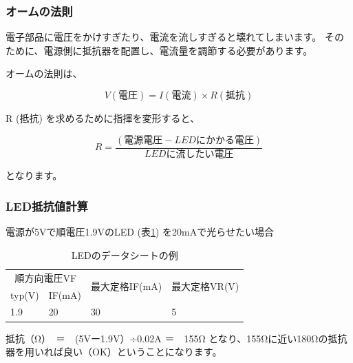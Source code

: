 \documentclass[11pt,a4paper]{jarticle}
\begin{document}
\subsubsection*{オームの法則}
電子部品に電圧をかけすぎたり、電流を流しすぎると壊れてしまいます。
そのために、電源側に抵抗器を配置し、電流量を調節する必要があります。

オームの法則は、

\begin{equation}
 V (電圧) = I (電流) \times R (抵抗)
\end{equation}

R (抵抗) を求めるために指揮を変形すると、

\begin{equation}
 R = \frac{(電源電圧 - LEDにかかる電圧)}{LEDに流したい電圧}
\end{equation}

となります。

\subsubsection*{LED抵抗値計算}
電源が5Vで順電圧1.9VのLED (表\ref{tb:dataSheet}) を20mAで光らせたい場合

\begin{table}[htb]
 \begin{center}
 \caption{LEDのデータシートの例}
 \label{tb:dataSheet}
  \begin{tabular}{|l|l|l|l|} \hline
   \multicolumn{2}{|c|}{順方向電圧VF} & \multirow{2}{*}{最大定格IF(mA)} & \multirow{2}{*}{最大定格VR(V)} \\ \cline{1-2}
   typ(V) & IF(mA) & &\\ \hline
   1.9 & 20 & 30 & 5 \\ \hline
  \end{tabular}
 \end{center}
\end{table}

抵抗（Ω）　＝　(5Vー1.9V）÷0.02A ＝　155Ω
となり、155Ωに近い180Ωの抵抗器を用いれば良い（OK）ということになります。

%

\end{document}
